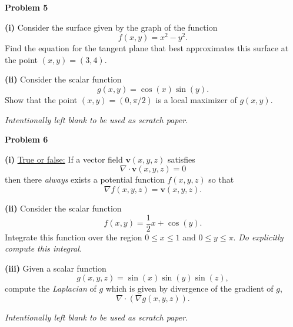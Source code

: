\documentclass[12pt]{amsbook}
\begin{document}
\textbf{Problem 5}

\vspace{.25cm}

\textbf{(i)} Consider the surface given by the graph of the function
\[
f(x,y) = x^2-y^2.
\]
Find the equation for the tangent plane that best approximates this surface at the point $(x,y)=(3,4)$.
\vspace*{7cm}

\textbf{(ii)} Consider the scalar function
\[
g(x,y)=\cos(x)\sin(y).
\]
Show that the point $(x,y)=(0,\pi/2)$ is a local maximizer of $g(x,y)$.


\newpage
\emph{Intentionally left blank to be used as scratch paper.}\\












\newpage

\textbf{Problem 6} 

\vspace{.25cm}

\textbf{(i)} \underline{True or false:} If a vector field $\mathbf{v}(x,y,z)$ satisfies 
\[
\nabla \cdot \mathbf{v}(x,y,z) = 0
\]
then there \emph{always} exists a potential function $f(x,y,z)$ so that
\[
\nabla f(x,y,z) = \mathbf{v}(x,y,z).
\]
\vspace*{1cm}


\textbf{(ii)} Consider the scalar function
\[
f(x,y) = \frac{1}{2}x+\cos(y).
\]
Integrate this function over the region $0\leq x \leq 1$ and $0\leq y \leq \pi$. \emph{Do explicitly compute this integral.}
\vspace*{8cm}

\textbf{(iii)} Given a scalar function 
\[
g(x,y,z) = \sin(x)\sin(y)\sin(z),
\]
compute the \emph{Laplacian} of $g$ which is given by divergence of the gradient of $g$, 
\[
\nabla \cdot (\nabla g(x,y,z)).
\]
\vspace*{5cm}









\newpage
\emph{Intentionally left blank to be used as scratch paper.}\\
\end{document}
